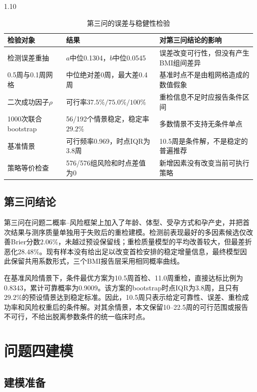 \documentclass[12pt,a4paper]{ctexrep}
\numberwithin{equation}{section}
\begin{document}
\begin{spacing}{1.10}
{			\begin{table}[H]
			\centering
			\footnotesize
			\renewcommand{\arraystretch}{1.15}
			\caption{第三问的误差与稳健性检验}
			\label{tab:q3_robustness}
			\begin{tabularx}{\textwidth}{@{}p{}p{}X@{}}
			\toprule
			检验对象 & 结果 & 对第三问结论的影响 \\
			\midrule
			检测误差重抽 & $a$中位0.1304，$b$中位0.0545 & 误差改变可行性，但没有产生BMI组间差异 \\
			0.5周与0.1周网格 & 中位绝对差0周，最大差0.4周 & 基准时点不是由粗网格造成的数值假象 \\
			二次成功因子$\rho$ & 可行率$37.5\%/75.0\%/100\%$ & 重检信息不足时应报告条件区间 \\
			1000次联合bootstrap & 56/192个情景稳定，稳定率$29.2\%$ & 多数情景不支持无条件单点 \\
			基准情景 & 可行频率0.969，时点IQR为3.8周 & 10.5周是条件解，不是稳定的普遍推荐 \\
			策略等价检查 & 576/576组风险和时点差值为0 & 新增因素没有改变当前可执行策略 \\
			\bottomrule
			\end{tabularx}
			\end{table}

			\subsection{第三问结论}
			第三问在问题二概率--风险框架上加入了年龄、体型、受孕方式和孕产史，并把首次结果与测序质量单独用于失败后的重检建模。检测前表现最好的多因素候选仅改善Brier分数$2.06\%$，未越过预设保留线；重检质量模型的平均改善较大，但最差折恶化$28.48\%$。现有样本没有给出足以改变首检安排的稳定增量信息，最终模型因此保留共用系数形式，三个BMI报告层采用相同概率曲线。

			在基准风险情景下，条件最优方案为10.5周首检、11.0周重检，直接达标比例为0.8343，累计可靠概率为0.9009。该方案的bootstrap时点IQR为3.8周，且只有$29.2\%$的预设情景达到稳定标准。因此，10.5周只表示给定可靠性、误差、重检成功率和风险权重后的条件解。对其余情景，本文保留10--22.5周的可行范围或报告不可行，不给出脱离参数条件的统一临床时点。

			\section{问题四建模}
			\subsection{建模准备}
}
\end{spacing}
\end{document}
